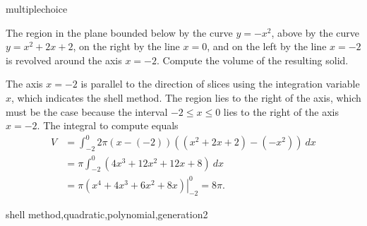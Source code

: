 \documentclass{ximera}
\begin{document}
\begin{question}[ShellQuad001]
\begin{type}
multiplechoice
\end{type}
The region in the plane bounded below by the curve \(y=-x^2\), above by the curve \(y=x^2+2x+2\), on the right by the line  \(x = 0\), and on the left by the line \(x = -2\) is revolved around the axis \(x = -2\). Compute the volume of the resulting solid.
\begin{multiplechoice}
\choice{\(4\pi\)}
\choice{\(6\pi\)}
\choice[correct]{\(8\pi\)}
\choice{\(10\pi\)}
\choice{\(12\pi\)}
\choice{\(14\pi\)}
\end{multiplechoice}
\begin{feedback}
The axis \(x = -2\) is parallel to the direction of slices using the integration variable \(x\), which indicates the shell method. 
 The region lies to the right of the axis, which must be the case because the interval \(-2 \leq x \leq 0\) lies to the right of the axis \(x = -2\).
The integral to compute equals \[ \begin{aligned} V &= \int_{-2}^{0}2 \pi (x-(-2))((x^2+2x+2)-(-x^2))~ dx\\
& = \pi \int_{-2}^{0} (4x^3+12x^2+12x+8)~ dx\\
& = \pi \left. \left(x^4+4x^3+6x^2+8x\right) \right|_{-2}^{0} = 8\pi. \end{aligned}\]
\end{feedback}
\begin{keywords}
shell method,quadratic,polynomial,generation2
\end{keywords}
\end{question}
\end{document}
